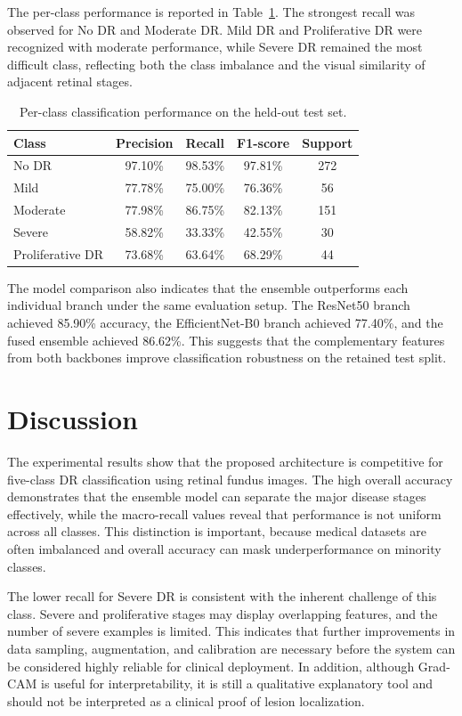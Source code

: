 \documentclass[conference]{IEEEtran}
\begin{document}
The per-class performance is reported in Table~\ref{tab:perclass}. The strongest recall was observed for No DR and Moderate DR. Mild DR and Proliferative DR were recognized with moderate performance, while Severe DR remained the most difficult class, reflecting both the class imbalance and the visual similarity of adjacent retinal stages.

\begin{table}[t]
\centering
\caption{Per-class classification performance on the held-out test set.}
\label{tab:perclass}
\begin{tabular}{lcccc}
\toprule
Class & Precision & Recall & F1-score & Support \\
\midrule
No DR & 97.10\% & 98.53\% & 97.81\% & 272 \\
Mild & 77.78\% & 75.00\% & 76.36\% & 56 \\
Moderate & 77.98\% & 86.75\% & 82.13\% & 151 \\
Severe & 58.82\% & 33.33\% & 42.55\% & 30 \\
Proliferative DR & 73.68\% & 63.64\% & 68.29\% & 44 \\
\bottomrule
\end{tabular}
\end{table}

The model comparison also indicates that the ensemble outperforms each individual branch under the same evaluation setup. The ResNet50 branch achieved 85.90\% accuracy, the EfficientNet-B0 branch achieved 77.40\%, and the fused ensemble achieved 86.62\%. This suggests that the complementary features from both backbones improve classification robustness on the retained test split.

\section{Discussion}
The experimental results show that the proposed architecture is competitive for five-class DR classification using retinal fundus images. The high overall accuracy demonstrates that the ensemble model can separate the major disease stages effectively, while the macro-recall values reveal that performance is not uniform across all classes. This distinction is important, because medical datasets are often imbalanced and overall accuracy can mask underperformance on minority classes.

The lower recall for Severe DR is consistent with the inherent challenge of this class. Severe and proliferative stages may display overlapping features, and the number of severe examples is limited. This indicates that further improvements in data sampling, augmentation, and calibration are necessary before the system can be considered highly reliable for clinical deployment. In addition, although Grad-CAM is useful for interpretability, it is still a qualitative explanatory tool and should not be interpreted as a clinical proof of lesion localization.
\end{document}
